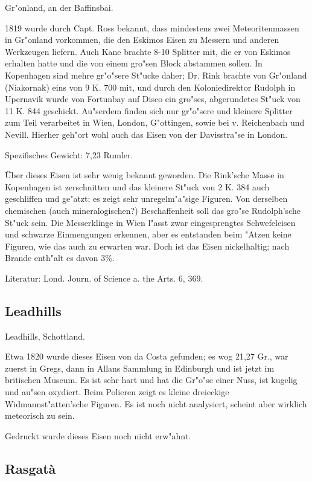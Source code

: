 \documentclass[a4paper, 11pt, oneside]{article}
\begin{document}
Gr"onland, an der Baffinsbai.

1819 wurde durch Capt. Ross bekannt, dass mindestens zwei Meteoritenmassen in Gr"onland vorkommen, die den Eskimos Eisen zu Messern und anderen Werkzeugen liefern. Auch Kane brachte 8-10 Splitter mit, die er von Eskimos erhalten hatte und die von einem gro"sen Block abstammen sollen. In Kopenhagen sind mehre gr"o"sere St"ucke daher; Dr. Rink brachte von Gr"onland (Niakornak) eins von 9 K. 700 mit, und durch den Koloniedirektor Rudolph in Upernavik wurde von Fortunbay auf Disco ein gro"ses, abgerundetes St"uck von 11 K. 844 geschickt. Au"serdem finden sich nur gr"o"sere und kleinere Splitter zum Teil verarbeitet in Wien, London, G"ottingen, sowie bei v. Reichenbach und Nevill. Hierher geh"ort wohl auch das Eisen von der Davisstra"se in London.

Spezifisches Gewicht: 7,23 Rumler.

Über dieses Eisen ist sehr wenig bekannt geworden. Die Rink'sche Masse in Kopenhagen ist zerschnitten und das kleinere St"uck von 2 K. 384 auch geschliffen und ge"atzt; es zeigt sehr unregelm"a"sige Figuren. Von derselben chemischen (auch mineralogischen?) Beschaffenheit soll das gro"se Rudolph'sche St"uck sein. Die Messerklinge in Wien l"asst zwar eingesprengtes Schwefeleisen und schwarze Einmengungen erkennen, aber es entstanden beim "Atzen keine Figuren, wie das auch zu erwarten war. Doch ist das Eisen nickelhaltig; nach Brande enth"alt es davon 3\%.

Literatur: Lond. Journ. of Science a. the Arts. 6, 369.

\subsection{Leadhills}

Leadhills, Schottland.

Etwa 1820 wurde dieses Eisen von da Costa gefunden; es wog 21,27 Gr., war zuerst in Gregs, dann in Allans Sammlung in Edinburgh und ist jetzt im britischen Museum. Es ist sehr hart und hat die Gr"o"se einer Nuss, ist kugelig und au"sen oxydiert. Beim Polieren zeigt es kleine dreieckige Widmannst"atten'sche Figuren. Es ist noch nicht analysiert, scheint aber wirklich meteorisch zu sein.

Gedruckt wurde dieses Eisen noch nicht erw"ahnt.

\subsection{Rasgatà}
\end{document}
